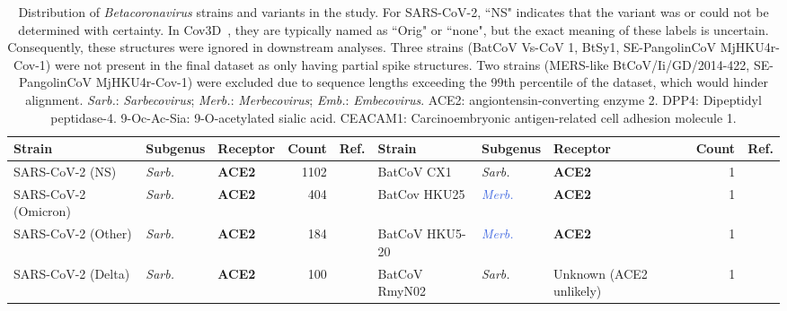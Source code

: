 \setlength{\tabcolsep}{2pt}
\begin{table}[htbp]
\centering
\scriptsize
\caption{Distribution of \textit{Betacoronavirus} strains and variants in the study. For SARS-CoV-2, ``NS" indicates that the variant was or could not be determined with certainty. In Cov3D~\cite{gowthaman2021}, they are typically named as ``Orig" or ``none", but the exact meaning of these labels is uncertain. Consequently, these structures were ignored in downstream analyses. Three strains (BatCoV Vs-CoV 1, BtSy1, SE-PangolinCoV MjHKU4r-Cov-1) were not present in the final dataset as only having partial spike structures. Two strains (MERS-like BtCoV/Ii/GD/2014-422, SE-PangolinCoV MjHKU4r-Cov-1) were excluded due to sequence lengths exceeding the 99th percentile of the dataset, which would hinder alignment. \textit{Sarb.}: \textit{Sarbecovirus}; \textit{Merb.}: \textit{Merbecovirus}; \textit{Emb.}: \textit{Embecovirus}. ACE2: angiontensin-converting enzyme 2. DPP4: Dipeptidyl peptidase-4. 9-Oc-Ac-Sia: 9-O-acetylated sialic acid. CEACAM1: Carcinoembryonic antigen-related cell adhesion molecule 1.}
\begin{tabular}{lllrclllrc}
\toprule
Strain                & Subgenus               & Receptor                    & Count & Ref.                                                                                & Strain                                  & Subgenus               & Receptor                & Count & Ref.                                                                         \\
\midrule
SARS-CoV-2 (NS)       & \textit{\textcolor{BrickRed}{Sarb.}} & \textbf{ACE2}               & 1102  & \cite{letko2020, lan2020, shang2020}     & BatCoV CX1                     & \textit{\textcolor{BrickRed}{Sarb.}} & \textbf{ACE2}                    & 1     & \cite{xu2025}           \\
SARS-CoV-2 (Omicron)  & \textit{\textcolor{BrickRed}{Sarb.}} & \textbf{ACE2}               & 404   & \cite{letko2020, lan2020, shang2020}     & BatCov HKU25                   & \textit{\textcolor{RoyalBlue}{Merb.}} & \textbf{ACE2}                    & 1     & \cite{liu2025}       \\
SARS-CoV-2 (Other)    & \textit{\textcolor{BrickRed}{Sarb.}} & \textbf{ACE2}               & 184   & \cite{letko2020, lan2020, shang2020}     & BatCoV HKU5-20                 & \textit{\textcolor{RoyalBlue}{Merb.}} & \textbf{ACE2}                    & 1     & \cite{catanzaro2025}      \\
SARS-CoV-2 (Delta)    & \textit{\textcolor{BrickRed}{Sarb.}} & \textbf{ACE2}               & 100   & \cite{letko2020, lan2020, shang2020}     & BatCoV RmyN02                  & \textit{\textcolor{BrickRed}{Sarb.}} & Unknown  (ACE2 unlikely)                 & 1     & \cite{zhou2020b}      \\

\end{tabular}
\end{table}
